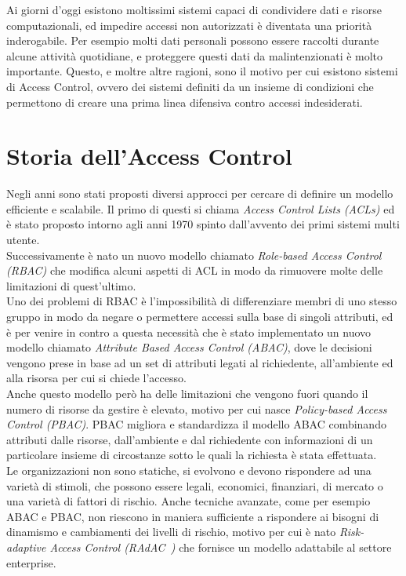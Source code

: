 \newcommand{\radac}{RAdAC\ }
\label{cap:accessControl}
Ai giorni d'oggi esistono moltissimi sistemi capaci di condividere dati e risorse computazionali, 
ed impedire accessi non autorizzati è diventata una priorità inderogabile.
Per esempio molti dati personali possono essere raccolti durante alcune attività quotidiane, e proteggere questi dati
da malintenzionati è molto importante.
Questo, e moltre altre ragioni, sono il motivo per cui esistono sistemi di Access Control, ovvero dei sistemi definiti da un insieme di condizioni 
che permettono di creare una prima linea difensiva contro accessi indesiderati.
\section{Storia dell'Access Control}
\label{sec:history}
Negli anni sono stati proposti diversi approcci per cercare di definire un modello efficiente e scalabile.
Il primo di questi si chiama \textit{Access Control Lists (ACLs)} ed è stato proposto intorno agli anni 1970 spinto dall'avvento dei primi sistemi multi utente.\\
Successivamente è nato un nuovo modello chiamato \textit{Role-based Access Control (RBAC)} che modifica alcuni aspetti di ACL  in modo da rimuovere molte delle limitazioni di quest'ultimo.\\
Uno dei problemi di RBAC è l'impossibilità di differenziare membri di uno stesso gruppo in modo da negare o permettere accessi sulla base di singoli attributi, ed è per venire in contro a questa necessità che è stato implementato un nuovo modello chiamato \textit{Attribute Based Access Control (ABAC)}, dove le decisioni vengono prese in base ad un set di attributi legati al richiedente, all'ambiente ed alla risorsa per cui si chiede l'accesso.\\
Anche questo modello però ha delle limitazioni che vengono fuori quando il numero di risorse da gestire è elevato, motivo per cui nasce \textit{Policy-based Access Control (PBAC)}.
PBAC migliora e standardizza il modello ABAC combinando attributi dalle risorse, dall'ambiente e dal richiedente con informazioni di un particolare insieme di circostanze sotto le quali la richiesta è stata effettuata.\\
Le organizzazioni non sono statiche, si evolvono e devono rispondere ad una varietà di stimoli, che possono essere legali, economici, finanziari, di mercato o una varietà di fattori di rischio.
Anche tecniche avanzate, come per esempio ABAC e PBAC, non riescono in maniera sufficiente a rispondere ai bisogni di dinamismo e cambiamenti dei livelli di rischio, motivo per cui è nato \textit{Risk-adaptive Access Control (\radac)} che fornisce un modello adattabile al settore enterprise.

